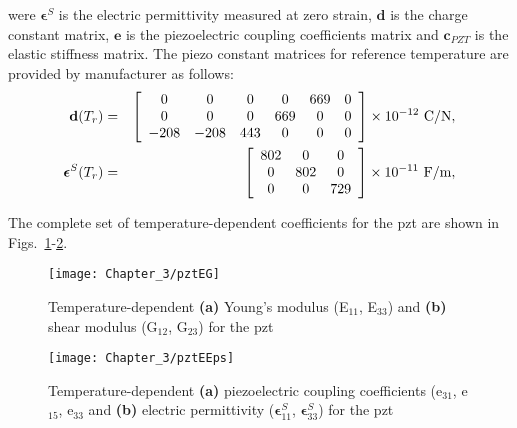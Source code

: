 %
were \(\boldsymbol{\epsilon}^S\) is the electric permittivity measured at zero strain, \(\boldsymbol{d}\) is the charge constant matrix, \(\boldsymbol{e}\) is the piezoelectric coupling coefficients matrix and \(\boldsymbol{c}_{PZT}\) is the elastic stiffness matrix.
The piezo constant matrices for reference temperature are provided by manufacturer as follows:
\begin{eqnarray}
	\textbf{d}(T_r) & = & \left[
	\begin{array}{cccccc}
	0 & 0 & 0 & 0 & 669 & 0\\
	0 & 0 & 0 & 669 & 0 & 0\\
	-208 & -208 & 443 & 0 & 0 & 0
	\end{array}\right] \times10^{-12}\ \unit[per-mode = symbol]{\coulomb\per\newton},\\
	\boldsymbol{\epsilon}^S(T_r) & = & \left[
	\begin{array}{ccc}
	802 & 0 & 0\\
	0 & 802 & 0\\
	0 & 0 & 729
\end{array}\right] \times10^{-11}\ \unit[per-mode = symbol]{\farad\per\meter},
\end{eqnarray}

The complete set of temperature-dependent coefficients for the \ac{pzt} are shown in Figs.~\ref{fig:pztEG}-\ref{fig:pztEEps}.

\begin{figure}
	\begin{center}
		\texttt{[image: Chapter\_3/pztEG]}
	\end{center}
	\caption{Temperature-dependent \textbf{(a)} Young's modulus (E\(_{11}\), E\(_{33}\)) and \textbf{(b)} shear modulus (G\(_{12}\), G\(_{23}\)) for the \acf{pzt}}
	\label{fig:pztEG}
\end{figure}
\begin{figure}
	\begin{center}
		\texttt{[image: Chapter\_3/pztEEps]}
	\end{center}
	\caption{Temperature-dependent \textbf{(a)} piezoelectric coupling coefficients (e\(_{31}\), e\(_{15}\), e\(_{33}\) and \textbf{(b)} electric permittivity (\(\boldsymbol{\epsilon}^S_{11}\), \(\boldsymbol{\epsilon}^S_{33}\)) for the \acf{pzt}}
	\label{fig:pztEEps}
\end{figure}
